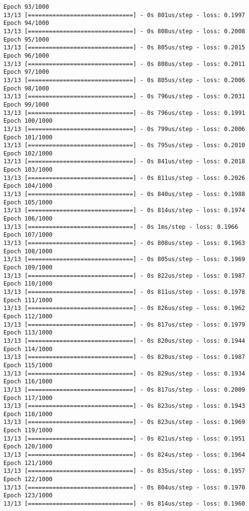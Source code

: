 \documentclass[11pt]{article}
\begin{document}
\begin{Verbatim}[commandchars=\\\{\}]
Epoch 93/1000
13/13 [==============================] - 0s 801us/step - loss: 0.1997
Epoch 94/1000
13/13 [==============================] - 0s 808us/step - loss: 0.2008
Epoch 95/1000
13/13 [==============================] - 0s 805us/step - loss: 0.2015
Epoch 96/1000
13/13 [==============================] - 0s 808us/step - loss: 0.2011
Epoch 97/1000
13/13 [==============================] - 0s 805us/step - loss: 0.2006
Epoch 98/1000
13/13 [==============================] - 0s 796us/step - loss: 0.2031
Epoch 99/1000
13/13 [==============================] - 0s 796us/step - loss: 0.1991
Epoch 100/1000
13/13 [==============================] - 0s 799us/step - loss: 0.2006
Epoch 101/1000
13/13 [==============================] - 0s 795us/step - loss: 0.2010
Epoch 102/1000
13/13 [==============================] - 0s 841us/step - loss: 0.2018
Epoch 103/1000
13/13 [==============================] - 0s 811us/step - loss: 0.2026
Epoch 104/1000
13/13 [==============================] - 0s 840us/step - loss: 0.1988
Epoch 105/1000
13/13 [==============================] - 0s 814us/step - loss: 0.1974
Epoch 106/1000
13/13 [==============================] - 0s 1ms/step - loss: 0.1966
Epoch 107/1000
13/13 [==============================] - 0s 808us/step - loss: 0.1963
Epoch 108/1000
13/13 [==============================] - 0s 805us/step - loss: 0.1969
Epoch 109/1000
13/13 [==============================] - 0s 822us/step - loss: 0.1987
Epoch 110/1000
13/13 [==============================] - 0s 811us/step - loss: 0.1978
Epoch 111/1000
13/13 [==============================] - 0s 826us/step - loss: 0.1962
Epoch 112/1000
13/13 [==============================] - 0s 817us/step - loss: 0.1979
Epoch 113/1000
13/13 [==============================] - 0s 820us/step - loss: 0.1944
Epoch 114/1000
13/13 [==============================] - 0s 820us/step - loss: 0.1987
Epoch 115/1000
13/13 [==============================] - 0s 829us/step - loss: 0.1934
Epoch 116/1000
13/13 [==============================] - 0s 817us/step - loss: 0.2009
Epoch 117/1000
13/13 [==============================] - 0s 823us/step - loss: 0.1943
Epoch 118/1000
13/13 [==============================] - 0s 823us/step - loss: 0.1969
Epoch 119/1000
13/13 [==============================] - 0s 821us/step - loss: 0.1951
Epoch 120/1000
13/13 [==============================] - 0s 824us/step - loss: 0.1964
Epoch 121/1000
13/13 [==============================] - 0s 835us/step - loss: 0.1957
Epoch 122/1000
13/13 [==============================] - 0s 804us/step - loss: 0.1970
Epoch 123/1000
13/13 [==============================] - 0s 814us/step - loss: 0.1960

\end{Verbatim}
\end{document}
